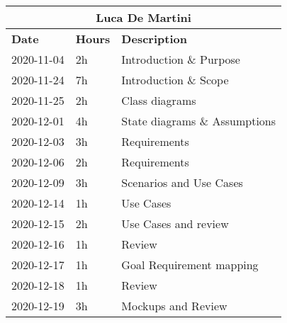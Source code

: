 
\begin{table}[H]
    \centering
    \begin{tabular}{|l|l|l|}
        \multicolumn{3}{c}{\textbf{Luca De Martini}}                   \\
        \hline
        \textbf{Date} & \textbf{Hours} & \textbf{Description}          \\\hline
        2020-11-04    & 2h             & Introduction \& Purpose       \\\hline
        2020-11-24    & 7h             & Introduction \& Scope         \\\hline
        2020-11-25    & 2h             & Class diagrams                \\\hline
        2020-12-01    & 4h             & State diagrams \& Assumptions \\\hline
        2020-12-03    & 3h             & Requirements                  \\\hline
        2020-12-06    & 2h             & Requirements                  \\\hline
        2020-12-09    & 3h             & Scenarios and Use Cases       \\\hline
        2020-12-14    & 1h             & Use Cases                     \\\hline
        2020-12-15    & 2h             & Use Cases and review          \\\hline
        2020-12-16    & 1h             & Review                        \\\hline
        2020-12-17    & 1h             & Goal Requirement mapping      \\\hline
        2020-12-18    & 1h             & Review                        \\\hline
        2020-12-19    & 3h             & Mockups and Review            \\\hline
    \end{tabular}
\end{table}
